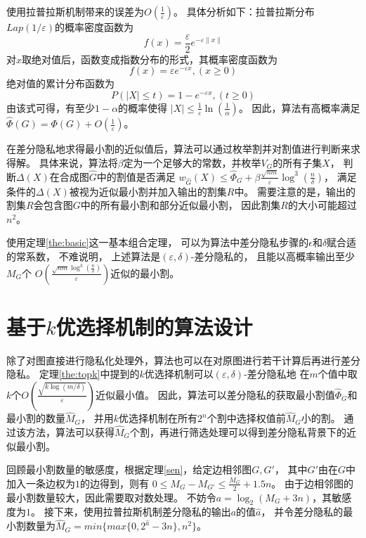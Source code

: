 使用拉普拉斯机制带来的误差为$O(\frac{1}{\varepsilon})$。
具体分析如下：拉普拉斯分布$Lap(1/\varepsilon)$的概率密度函数为
\begin{equation}
    f(x)=\frac \varepsilon{2} e^{-\varepsilon\|x\|}
\end{equation}
对$x$取绝对值后，函数变成指数分布的形式，其概率密度函数为
\begin{equation}
    f(x)=\varepsilon e^{-\varepsilon x},(x\geq 0)
\end{equation}
绝对值的累计分布函数为
\begin{equation}
    P(|X|\leq t)=1-e^{-\varepsilon x},(t\geq 0)
\end{equation}
由该式可得，有至少$1-\alpha$的概率使得
$|X|\leq \frac1\varepsilon\ln\left(\frac1\alpha\right)$。
因此，算法有高概率满足$\hat\Phi(G)=\Phi(G)+O(\frac1\varepsilon)$。

在差分隐私地求得最小割的近似值后，算法可以通过枚举割并对割值进行判断来求得解。
具体来说，算法将$\beta$定为一个足够大的常数，并枚举$V_G$的所有子集$X$，
判断$\Delta(X)$在合成图$\hat G$中的割值是否满足
$w_{\hat G}(X)\leq \hat \Phi_G+\beta \frac{\sqrt{nm}}{\varepsilon} \log^3 \left(\frac{n}{\delta}\right)$，
满足条件的$\Delta(X)$被视为近似最小割并加入输出的割集$R$中。
需要注意的是，输出的割集$R$会包含图$G$中的所有最小割和部分近似最小割，
因此割集$R$的大小可能超过$n^2$。

使用定理\ref{the:basic}这一基本组合定理，
可以为算法中差分隐私步骤的$\epsilon$和$\delta$赋合适的常系数，
不难说明，
上述算法是$(\varepsilon,\delta)$-差分隐私的，
且能以高概率输出至少$M_G$个
$O\left(\frac{\sqrt{nm}\log^3 \left(\frac{n}{\delta}\right)}{\varepsilon} \right)$近似的最小割。

\section{基于$k$优选择机制的算法设计}

除了对图直接进行隐私化处理外，算法也可以在对原图进行若干计算后再进行差分隐私。
定理\ref{the:topk}中提到的$k$优选择机制可以$(\varepsilon,\delta)$-差分隐私地
在$m$个值中取$k$个$O(\frac{\sqrt{k\log(m/\delta)}}{\varepsilon})$近似最小值。
因此，算法可以差分隐私的获取最小割值$\hat \Phi_G$和最小割的数量$\hat M_G$，
并用$k$优选择机制在所有$2^n$个割中选择权值前$\hat M_G$小的割。
通过该方法，算法可以获得$\hat M_G$个割，再进行筛选处理可以得到差分隐私背景下的近似最小割。

回顾最小割数量的敏感度，根据定理\ref{sen}，给定边相邻图$G,G'$，
其中$G'$由在$G$中加入一条边权为$1$的边得到，则有
$0\leq M_G-M_{G'}\leq \frac{M_G}2+1.5n$。
由于边相邻图的最小割数量较大，因此需要取对数处理。
不妨令$a=\log_2(M_G+3n)$，其敏感度为$1$。
接下来，使用拉普拉斯机制差分隐私的输出$a$的值$\hat a$，
并令差分隐私的最小割数量为$\hat M_G=min{\{max{\{0,2^{\hat a}-3n\}},n^2\}}$。

